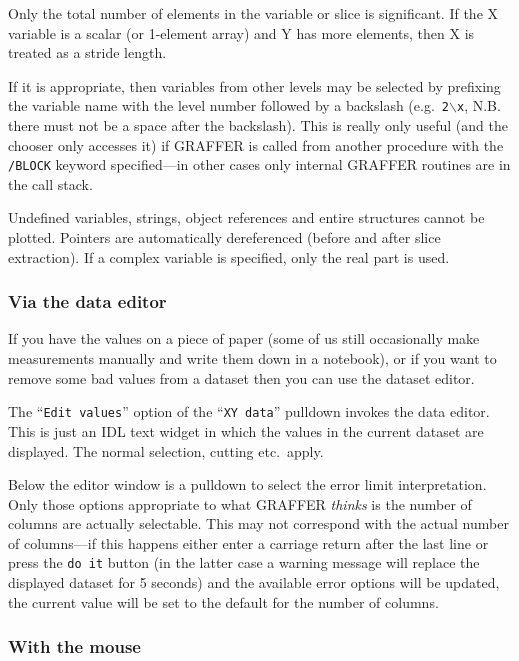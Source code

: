 \documentclass[11pt,twoside,english]{article}
\begin{document}
Only the total number of elements in the variable or
slice is significant. If the X variable is a scalar (or 1-element
array) and Y has more elements, then X is treated as a stride length.

If it is appropriate, then variables from other levels may be selected
by prefixing the variable name with the level number followed by a
backslash (e.g.\ \texttt{2$\mathtt{\backslash}$x}, N.B. there must not be a
space after the backslash). This is really only useful (and the chooser
only accesses it) if GRAFFER is called from another procedure with the
\texttt{/BLOCK} keyword specified---in other cases only internal
GRAFFER routines are in the call stack.

Undefined variables, strings, object references and entire structures
cannot be plotted. Pointers are automatically dereferenced (before and
after slice extraction). If a complex variable is specified, only the
real part is used.

\subsubsection{Via the data editor }

If you have the values on a piece of paper (some of us still
occasionally make measurements manually and write them down in a
notebook), or if you want to remove some bad values from a dataset then
you can use the dataset editor.

The {}``\texttt{Edit values}'' option of the {}``\texttt{XY data}''
pulldown invokes the data editor. This is just an IDL text widget in
which the values in the current dataset are displayed. The normal
selection, cutting etc.\ apply.

Below the editor window is a pulldown to select the error limit
interpretation.  Only those options appropriate to what GRAFFER
\textit{thinks} is the number of columns are actually selectable. This
may not correspond with the actual number of columns---if this happens
either enter a carriage return after the last line or press the
\texttt{do it} button (in the latter case a warning message will
replace the displayed dataset for 5 seconds) and the available error
options will be updated, the current value will be set to the default
for the number of columns.


\subsubsection{With the mouse}
\end{document}
